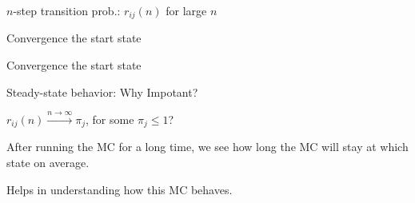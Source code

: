 \begin{frame}{$n$-step transition prob.: $r_{ij}(n)$ for large $n$}

{
\bci
\item<2-> \small Convergence  the start state
\eci


\vspace{-0.3cm}
}
{
\bci
\item<3-> \small Convergence  the start state
\eci


\vspace{-0.3cm}
}


\end{frame}


\begin{frame}{Steady-state behavior: Why Impotant?}

{
\plitemsep 0.1in

\bci
\item $r_{ij}(n) \xrightarrow{n \rightarrow \infty} \pi_j$, for some $\pi_j \le 1$?

\item<2-> 

\item<3-> After running the MC for a long time, we see
  how long the MC will stay at which state on average. 

\item<4-> Helps in understanding how this MC behaves. 

  \eci

}
{
\centering
{}
}

\end{frame}


